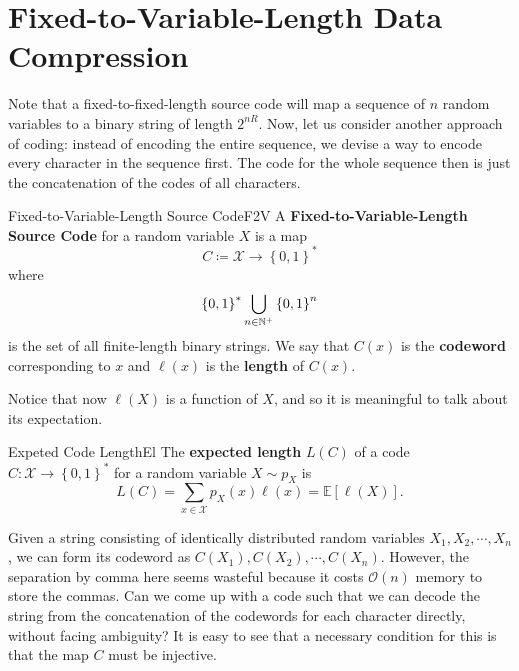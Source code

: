\documentclass[math]{amznotes}
\theoremstyle{remark}
\begin{document}
\section{Fixed-to-Variable-Length Data Compression}
Note that a fixed-to-fixed-length source code will map a sequence of $n$ random variables to a binary string of length $2^{nR}$. Now, let us consider another approach of coding: instead of encoding the entire sequence, we devise a way to encode every character in the sequence first. The code for the whole sequence then is just the concatenation of the codes of all characters. 
\begin{dfnbox}{Fixed-to-Variable-Length Source Code}{F2V}
    A {\color{red} \textbf{Fixed-to-Variable-Length Source Code}} for a random variable $X$ is a map 
    \begin{equation*}
        C \coloneqq \mathcal{X} \to \left\{0, 1\right\}^*
    \end{equation*}
    where 
    \begin{equation*}
        \left\{0, 1\right\}^*\bigcup_{n \in \mathbb{N}^+}\left\{0, 1\right\}^n
    \end{equation*}
    is the set of all finite-length binary strings. We say that $C\left(x\right)$ is the {\color{red} \textbf{codeword}} corresponding to $x$ and $\ell\left(x\right)$ is the {\color{red} \textbf{length}} of $C\left(x\right)$.
\end{dfnbox}
Notice that now $\ell\left(X\right)$ is a function of $X$, and so it is meaningful to talk about its expectation.
\begin{dfnbox}{Expeted Code Length}{El}
    The {\color{red} \textbf{expected length}} $L\left(C\right)$ of a code $C \colon \mathcal{X} \to \left\{0, 1\right\}^*$ for a random variable $X \sim p_X$ is 
    \begin{equation*}
        L\left(C\right) = \sum_{x \in \mathcal{X}}p_X\left(x\right)\ell\left(x\right) = \mathbb{E}\left[\ell\left(X\right)\right].
    \end{equation*} 
\end{dfnbox}
Given a string consisting of identically distributed random variables $X_1, X_2, \cdots, X_n$, we can form its codeword as $C\left(X_1\right), C\left(X_2\right), \cdots, C\left(X_n\right)$. However, the separation by comma here seems wasteful because it costs $\mathcal{O}\left(n\right)$ memory to store the commas. Can we come up with a code such that we can decode the string from the concatenation of the codewords for each character directly, without facing ambiguity? It is easy to see that a necessary condition for this is that the map $C$ must be injective.
\end{document}
